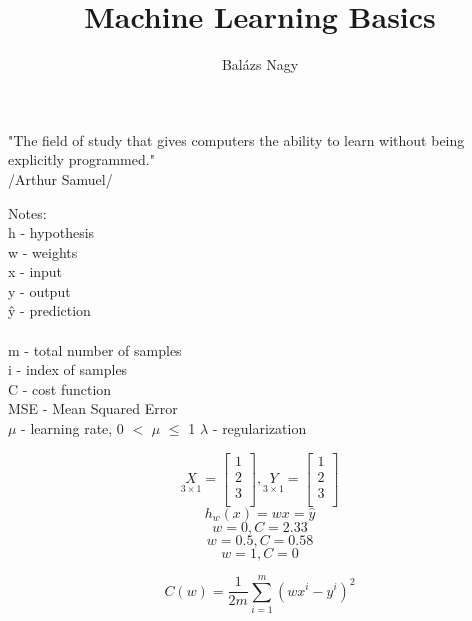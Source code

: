 \documentclass[12pt]{article}
\author{Balázs Nagy}
\title{Machine Learning Basics}
\begin{document}
\maketitle
\bigskip

"The field of study that gives computers the ability to learn without being explicitly programmed."\\

\hfill /Arthur Samuel/
\pagebreak

Notes:\\
h - hypothesis\\
w - weights\\
x - input \\
y - output \\
\^{y} - prediction\\ 
\\
m - total number of samples\\
i - index of samples\\
C - cost function\\
MSE - Mean Squared Error\\
$\mu$ - learning rate, 0 $<$ $\mu$ $\leq$ 1 
$\lambda$ - regularization 

\begin{equation}
\underset{3\times 1}{X}=\left[
\begin{matrix}
	1\\
	2\\
	3\\
\end{matrix} \right], 
\underset{3\times 1}{Y}=\left[
\begin{matrix}
	1\\
	2\\
	3\\
\end{matrix} \right]
\end{equation}
\begin{equation}
h_{w}(x)=wx= \hat{y}
\end{equation}
\begin{equation}
w = 0, C = 2.33
\end{equation}
\begin{equation}
w = 0.5, C = 0.58
\end{equation}
\begin{equation}
w = 1, C = 0
\end{equation}

\begin{equation}
C(w)
=\frac{1}{2m}\sum_{i=1}^{m}(wx^i-y^{i})^2
\end{equation}
\end{document}
